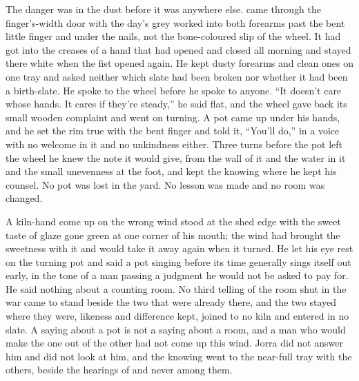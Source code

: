 The danger was in the dust before it was anywhere else.  came through the finger's-width door with the day's grey worked into both forearms past the bent little finger and under the nails, not the bone-coloured slip of the wheel. It had got into the creases of a hand that had opened and closed all morning and stayed there white when the fist opened again. He kept dusty forearms and clean ones on one tray and asked neither which slate had been broken nor whether it had been a birth-slate. He spoke to the wheel before he spoke to anyone. “It doesn't care whose hands. It cares if they're steady,” he said flat, and the wheel gave back its small wooden complaint and went on turning. A pot came up under his hands, and he set the rim true with the bent finger and told it, “You'll do,” in a voice with no welcome in it and no unkindness either. Three turns before the pot left the wheel he knew the note it would give, from the wall of it and the water in it and the small unevenness at the foot, and kept the knowing where he kept his counsel. No pot was lost in the yard. No lesson was made and no room was changed.

A kiln-hand come up on the wrong wind stood at the shed edge with the sweet taste of glaze gone green at one corner of his mouth; the wind had brought the sweetness with it and would take it away again when it turned. He let his eye rest on the turning pot and said a pot singing before its time generally sings itself out early, in the tone of a man passing a judgment he would not be asked to pay for. He said nothing about a counting room. No third telling of the room shut in the war came to stand beside the two that were already there, and the two stayed where they were, likeness and difference kept, joined to no kiln and entered in no slate. A saying about a pot is not a saying about a room, and a man who would make the one out of the other had not come up this wind. Jorra did not answer him and did not look at him, and the knowing went to the near-full tray with the others, beside the hearings of  and never among them.

\scenebreak

